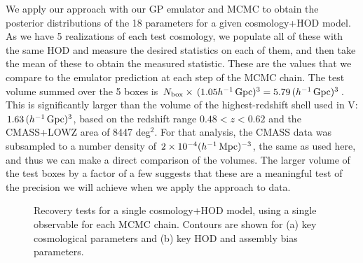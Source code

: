 We apply our approach with our GP emulator and MCMC to obtain the posterior distributions of the 18 parameters for a given cosmology+HOD model.
As we have 5 realizations of each test cosmology, we populate all of these with the same HOD and measure the desired statistics on each of them, and then take the mean of these to obtain the measured statistic. 
These are the values that we compare to the emulator prediction at each step of the MCMC chain.
The \aemulus test volume summed over the 5 boxes is $N_\mathrm{box} \times \, (1.05 h^{-1}\,\mathrm{Gpc})^3 = 5.79 \, (h^{-1}\,\mathrm{Gpc})^3$.
This is significantly larger than the volume of the highest-redshift shell used in \aemulus V: $1.63 \, (h^{-1}\,\mathrm{Gpc})^3$, based on the redshift range $0.48 < z < 0.62$ and the CMASS+LOWZ area of 8447 deg$^2$.
For that analysis, the CMASS data was subsampled to a number density of $2 \times 10^{-4} (h^{-1}\,\mathrm{Mpc})^{-3}$, the same as used here, and thus we can make a direct comparison of the volumes. 
The larger volume of the \aemulus test boxes by a factor of a few suggests that these are a meaningful test of the precision we will achieve when we apply the approach to data.

\begin{figure}%
\centering
{}
\hspace{0.07\textwidth}
\caption{Recovery tests for a single cosmology+HOD model, using a single observable for each MCMC chain. Contours are shown for (a) key cosmological parameters and (b) key HOD and assembly bias parameters.}
\label{fig:contours_single}
\end{figure}

